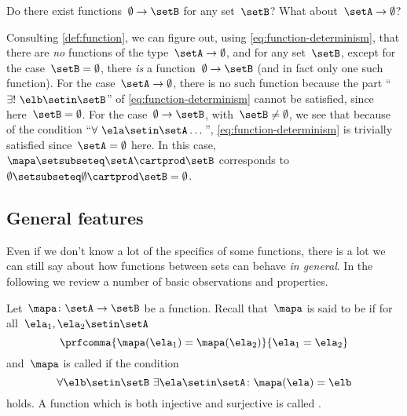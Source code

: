 Do there exist functions~$\emptyset \to \setB$ for any set~$\setB$?
What about~$\setA \to \emptyset$?

Consulting \cref{def:function}, we can figure out, using \cref{eq:function-determinism}, that there are \emph{no} functions of the type~$\setA \to \emptyset$, and for any set~$\setB$, except for the case~$\setB = \emptyset$, there \emph{is} a function~$\emptyset \to \setB$ (and in fact only one such function).
For the case~$\setA \to \emptyset$, there is no such function because the part ``$\exists ! \ \elb \setin\setB$'' of \cref{eq:function-determinism} cannot be satisfied, since here~$\setB = \emptyset$.
For the case~$\emptyset \to \setB$, with~$\setB \neq \emptyset$, we see that because of the condition ``$\forall \ \ela \setin\setA \dots$'', \cref{eq:function-determinism} is trivially satisfied since~$\setA = \emptyset$ here.
In this case,~$\mapa \setsubseteq \setA \cartprod \setB$ corresponds to~$\emptyset \setsubseteq \emptyset \cartprod \setB = \emptyset$.

\subsection{General features}

Even if we don't know a lot of the specifics of some functions, there is a lot we can still say about how functions between sets can behave \emph{in general}.
In the following we review a number of basic observations and properties.

Let~$\mapa\colon \setA \to \setB$ be a function.
Recall that~$\mapa$ is said to be \emph{} if for all~$\ela_1, \ela_2 \setin\setA$
\begin{equation}
    \label{eq:injectivity-cond}
    \prfcomma{\mapa(\ela_1) = \mapa(\ela_2)}{\ela_1 = \ela_2}
\end{equation}
and~$\mapa$ is called \emph{} if the condition
\begin{equation}
    \label{eq:surjectivity-cond}
    \forall \elb \setin\setB \ \exists  \ela \setin\setA \colon \mapa(\ela) = \elb
\end{equation}
holds.
A function which is both injective and surjective is called \emph{}.

